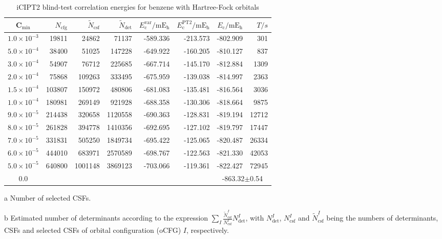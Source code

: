 \documentclass[journal=jcp,manuscript=suppinfo]{achemso}
\begin{document}
\begin{table}[!htp]
	\small
	\caption{iCIPT2 blind-test correlation energies for benzene with Hartree-Fock orbitals }
	\begin{threeparttable}
		\centering
	\begin{tabular}{c|rrrrrrr}\toprule
		C$_{\text{min}}$&$N_{\mathrm{cfg}}$&$\tilde{N}_{\mathrm{csf}}$\tnote{a}&$\tilde{N}_{\mathrm{det}}$\tnote{b}
		&$E_{\mathrm{c}}^{\mathrm{var}}/\mathrm{mE_h}$&$E_{\mathrm{c}}^{\mathrm{PT2}}/\mathrm{mE_h}$&$E_{\mathrm{c}}/\mathrm{mE_h}$&$T/s$\tnote{c}\\\toprule
			$1.0\times10^{-3}$ &    19811 &    24862 &  71137&  -589.336  &  -213.573&  -802.909 &301  \\
			$5.0\times10^{-4}$ &    38400 &    51025 & 147228&  -649.922  &  -160.205&  -810.127 &837  \\
			$3.0\times10^{-4}$ &    54907 &    76712 & 225685&  -667.714  &  -145.170&  -812.884 &1309 \\
			$2.0\times10^{-4}$ &    75868 &   109263 & 333495&  -675.959  &  -139.038&  -814.997 &2363 \\
			$1.5\times10^{-4}$ &   103807 &   150972 & 480806&  -681.083  &  -135.481&  -816.564 &3036 \\
			$1.0\times10^{-4}$ &   180981 &   269149 & 921928&  -688.358  &  -130.306&  -818.664 &9875 \\
			$9.0\times10^{-5}$ &   214438 &   320658 &1120558&  -690.363  &  -128.831&  -819.194 &12712\\
			$8.0\times10^{-5}$ &   261828 &   394778 &1410356&  -692.695  &  -127.102&  -819.797 &17447\\
			$7.0\times10^{-5}$ &   331831 &   505250 &1849734&  -695.422  &  -125.065&  -820.487 &26334\\
			$6.0\times10^{-5}$ &   444010 &   683971 &2570589&  -698.767  &  -122.563&  -821.330 &42053\\
			$5.0\times10^{-5}$ &   640800 &  1001148 &3869123&  -703.066  &  -119.361&  -822.427 &72945\\\midrule
			0.0\tnote{b}&&&&&&\multicolumn{2}{c}{-863.32$\pm$0.54}\\\bottomrule
		\end{tabular}
\begin{tablenotes}
\item[a]Number of selected CSFs.
\item[b]Estimated number of determinants according to the expression $\sum_I\frac{\tilde{N}_{\mathrm{csf}}^I}{N_{\mathrm{csf}}^I}N_{\mathrm{det}}^I$, with $N_{\mathrm{det}}^I$, $N_{\mathrm{csf}}^I$ and $\tilde{N}_{\mathrm{csf}}^I$ being the numbers of determinants, CSFs and selected CSFs of orbital configuration (oCFG) $I$, respectively.

\end{tablenotes}
\end{threeparttable}
\end{table}
\end{document}
